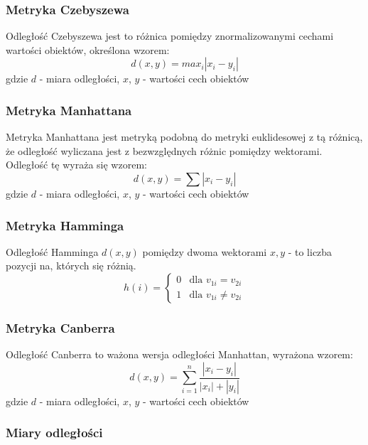 \documentclass{classrep}
\begin{document}
\subsubsection{Metryka Czebyszewa}
Odległość Czebyszewa jest to różnica pomiędzy znormalizowanymi cechami wartości obiektów, określona wzorem:
\begin{equation}
    d(x,y)=max_{i}|x_{i}-y_{i}|
\end{equation}
gdzie $d$ - miara odległości, $x$, $y$ - wartości cech obiektów

\subsubsection{Metryka Manhattana}
Metryka Manhattana jest metryką podobną do metryki euklidesowej z tą różnicą, że odległość wyliczana jest
z bezwzględnych różnic pomiędzy wektorami. Odległość tę wyraża się wzorem:
\begin{equation}
    d(x,y)=\sum |x_{i}-y_{i}|
\end{equation}
gdzie $d$ - miara odległości, $x$, $y$ - wartości cech obiektów

\subsubsection{Metryka Hamminga}
Odległość Hamminga $d(x,y)$ pomiędzy dwoma wektorami $x, y$ - to liczba pozycji na, których się różnią.
\begin{equation}
    h(i) =\left\{\begin{matrix}
                     0 & \text{dla }v_{1i}=v_{2i}\\
                     1 & \text{dla }v_{1i}\neq v_{2i}
    \end{matrix}\right.
\end{equation}

\subsubsection{Metryka Canberra}
Odległość Canberra to ważona wersja odległości Manhattan, wyrażona wzorem:
\begin{equation}
    d(x,y)=\sum_{i=1}^{n} \frac{|x_{i}-y_{i}|}{|x_{i}|+|y_{i}|}
\end{equation}
gdzie $d$ - miara odległości, $x$, $y$ - wartości cech obiektów

\subsubsection{Miary odległości}
\end{document}
